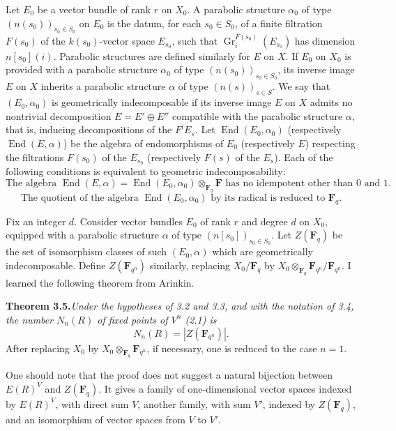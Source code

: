 \documentclass[11pt]{article}
\newcommand{\Fq}{\mathbf{F}_q}
\newcommand{\Fqn}{\mathbf{F}_{q^n}}
\newcommand{\F}{\mathbf{F}}
\newcommand{\End}{\operatorname{End}}
\newcommand{\Gr}{\operatorname{Gr}}
\begin{document}
Let \(E_0\) be a vector bundle of rank \(r\) on \(X_0\). A parabolic structure \(\alpha_0\) of type \((n(s_0))_{s_0\in S_0}\) on \(E_0\) is the datum, for each \(s_0\in S_0\), of a finite filtration \(F(s_0)\) of the \(k(s_0)\)-vector space \(E_{s_0}\), such that \(\Gr_i^{F(s_0)}(E_{s_0})\) has dimension \(n[s_0](i)\). Parabolic structures are defined similarly for \(E\) on \(X\). If \(E_0\) on \(X_0\) is provided with a parabolic structure \(\alpha_0\) of type \((n(s_0))_{s_0\in S_0}\), its inverse image \(E\) on \(X\) inherits a parabolic structure \(\alpha\) of type \((n(s))_{s\in S}\). We say that \((E_0,\alpha_0)\) is geometrically indecomposable if its inverse image \(E\) on \(X\) admits no nontrivial decomposition \(E=E'\oplus E''\) compatible with the parabolic structure \(\alpha\), that is, inducing decompositions of the \(F^iE_s\). Let \(\End(E_0,\alpha_0)\) (respectively \(\End(E,\alpha)\)) be the algebra of endomorphisms of \(E_0\) (respectively \(E\)) respecting the filtrations \(F(s_0)\) of the \(E_{s_0}\) (respectively \(F(s)\) of the \(E_s\)). Each of the following conditions is equivalent to geometric indecomposability:
\begin{equation}
\text{The algebra }\End(E,\alpha)=\End(E_0,\alpha_0)\otimes_{\Fq}\F\text{ has no idempotent other than }0\text{ and }1.
\tag{3.4.2}
\end{equation}
\begin{equation}
\text{The quotient of the algebra }\End(E_0,\alpha_0)\text{ by its radical is reduced to }\Fq.
\tag{3.4.3}
\end{equation}

Fix an integer \(d\). Consider vector bundles \(E_0\) of rank \(r\) and degree \(d\) on \(X_0\), equipped with a parabolic structure \(\alpha\) of type \((n[s_0])_{s_0\in S_0}\). Let \(Z(\Fq)\) be the set of isomorphism classes of such \((E_0,\alpha)\) which are geometrically indecomposable. Define \(Z(\Fqn)\) similarly, replacing \(X_0/\Fq\) by \(X_0\otimes_{\Fq}\Fqn/\Fqn\). I learned the following theorem from Arinkin.

\noindent\textbf{Theorem 3.5.}\quad\textit{Under the hypotheses of 3.2 and 3.3, and with the notation of 3.4, the number \(N_n(R)\) of fixed points of \(V^n\) (2.1) is}
\begin{equation}
  N_n(R)=|Z(\Fqn)|.
\tag{3.5.1}
\end{equation}
After replacing \(X_0\) by \(X_0\otimes_{\Fq}\Fqn\), if necessary, one is reduced to the case \(n=1\).

One should note that the proof does not suggest a natural bijection between \(E(R)^V\) and \(Z(\Fq)\). It gives a family of one-dimensional vector spaces indexed by \(E(R)^V\), with direct sum \(V\), another family, with sum \(V'\), indexed by \(Z(\Fq)\), and an isomorphism of vector spaces from \(V\) to \(V'\).
\end{document}
